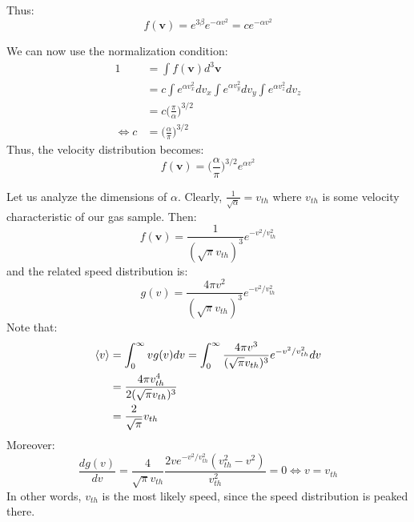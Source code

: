 \documentclass[a4paper,11pt,oneside]{book}
\newcommand{\BF}[1]{\boldsymbol{#1}}
\begin{document}
Thus:
\begin{equation}
    f(\BF{v}) = e^{3\beta} e^{-\alpha v^2} = ce^{-\alpha v^2}
\end{equation}

We can now use the normalization condition:
\begin{align}
    1 &= \int f(\BF{v}) d^3\BF{v}\\
    &= c \int e^{\alpha v_x^2} dv_x\int e^{\alpha v_y^2} dv_y \int e^{\alpha v_z^2} dv_z\\
    &= c\bigg(\frac{\pi}{\alpha}\bigg)^{3/2}\\
    \iff c &= \bigg(\frac{\alpha}{\pi}\bigg)^{3/2}
\end{align}
Thus, the velocity distribution becomes:
\begin{equation}
    f(\BF{v}) = \bigg(\frac{\alpha}{\pi}\bigg)^{3/2}e^{\alpha v^2}
\end{equation}

Let us analyze the dimensions of $\alpha$. Clearly, $\frac{1}{\sqrt{\alpha}} = v_{th}$ where $v_{th}$ is some velocity characteristic of our gas sample. Then:
\begin{equation}
    \boxed{f(\BF{v}) = \frac{1}{(\sqrt{\pi}v_{th})^3}e^{-v^2/v_{th}^2}}
\end{equation}
and the related speed distribution is:
\begin{equation}
    \boxed{g(v) = \frac{4\pi v^2}{(\sqrt{\pi}v_{th})^3}e^{-v^2/v_{th}^2}}
\end{equation}
Note that:
\begin{align}
    \braket{v} &= \int_{0}^\infty  v g(v) dv  = \int_{0}^\infty \frac{4\pi v^3}{(\sqrt{\pi}v_{th})^3}e^{-v^2/v_{th}^2} dv \\
    &= \frac{4\pi v_{th}^4}{2(\sqrt{\pi}v_{th})^3}\\
    &=\frac{2}{\sqrt{\pi}} v_{th}
\end{align}
Moreover:
\begin{equation}
    \frac{dg(v)}{dv} = \frac{4}{\sqrt{\pi}v_{th}}\frac{2ve^{-v^2/v_{th}^2}(v_{th}^2-v^2)}{v_{th}^2}=0
    \iff v=v_{th}
\end{equation}
In other words, $v_{th}$ is the most likely speed, since the speed distribution is peaked there. 
\end{document}
